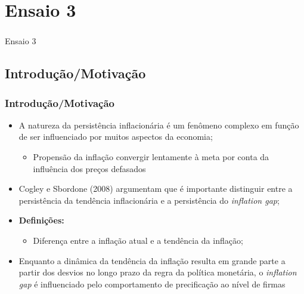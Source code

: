 \documentclass[aspectratio=169]{beamer}
\begin{document}
\section{Ensaio 3}
  
\begin{frame}\frametitle{}
  \begin{center}
  {\Huge Ensaio 3}
	\end{center}
\end{frame}

\subsection{Introdução/Motivação}

\begin{frame}\frametitle{Introdução/Motivação}
  \begin{itemize}
  \item A natureza da persistência inflacionária é um fenômeno complexo em função de ser influenciado por muitos aspectos da economia;
    \begin{itemize}
    \item Propensão da inflação convergir lentamente à meta por conta da influência dos preços defasados
    \end{itemize}
  \item Cogley e Sbordone (2008) argumentam que é importante distinguir entre a persistência da tendência inflacionária e a persistência do \emph{inflation gap};
  \item \textbf{Definições:}
    \begin{itemize}
    \item Diferença entre a inflação atual e a tendência da inflação;
    \end{itemize}
  \item Enquanto a dinâmica da tendência da inflação resulta em grande parte a partir dos desvios no longo prazo da regra da política monetária, o \emph{inflation gap} é influenciado pelo comportamento de precificação ao nível de firmas
  \end{itemize}
\end{frame}
\end{document}
